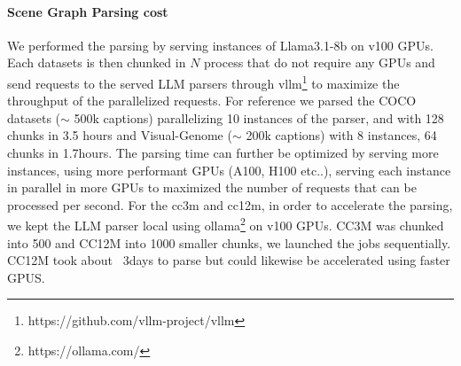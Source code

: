 {\paragraph{Scene Graph Parsing cost}
We performed the parsing by serving instances of Llama3.1-8b on v100 GPUs. Each datasets is then chunked in $N$ process that do not require any GPUs and send requests to the served LLM parsers through vllm\footnote{https://github.com/vllm-project/vllm} to maximize the throughput of the parallelized requests. For reference we parsed the COCO datasets ($\sim$ 500k captions) parallelizing 10 instances of the parser, and with 128 chunks in 3.5 hours and Visual-Genome ($\sim$ 200k captions) with 8 instances, 64 chunks in 1.7hours. The parsing time can further be optimized by serving more instances, using more performant GPUs (A100, H100 etc..), serving each instance in parallel in more GPUs to maximized the number of requests that can be processed per second.
For the cc3m and cc12m, in order to accelerate the parsing, we kept the LLM parser local using ollama\footnote{https://ollama.com/} on v100 GPUs. CC3M was chunked into 500 and CC12M into 1000 smaller chunks, we launched the jobs sequentially. CC12M took about ~3days to parse but could likewise be accelerated using faster GPUS.

}

